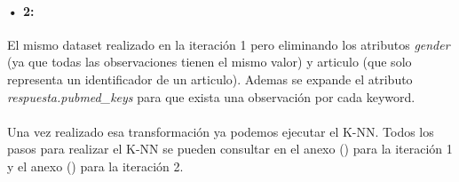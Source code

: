 \paragraph{• 2: } El mismo dataset realizado en la iteración 1 pero eliminando los atributos \textit{gender} (ya que todas las observaciones tienen el mismo valor) y articulo (que solo representa un identificador de un articulo). Ademas se expande el atributo \textit{respuesta.pubmed\_keys} para que exista una observación por cada keyword.

\paragraph{}
Una vez realizado esa transformación ya podemos ejecutar el K-NN. Todos los pasos para realizar el K-NN se pueden consultar en el anexo () para la iteración 1 y el anexo () para la iteración 2.